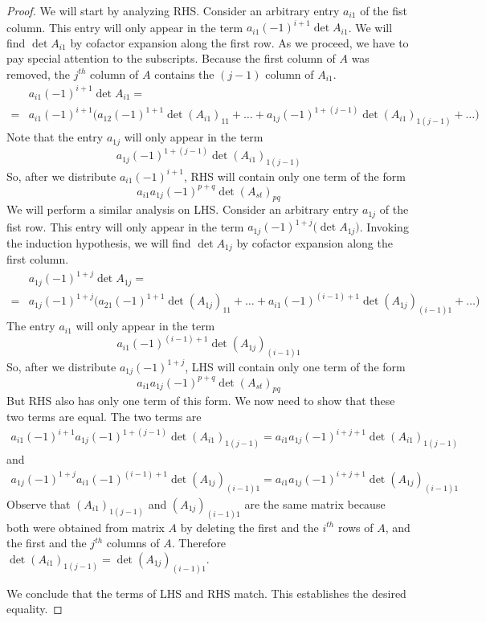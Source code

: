 \documentclass{ximera}
\begin{document}
\begin{proof}
We will start by analyzing RHS.  Consider an arbitrary entry $a_{i1}$ of the fist column.  This entry will only appear in the term $a_{i1}(-1)^{i+1}\det{A_{i1}}$. We will find $\det{A_{i1}}$ by cofactor expansion along the first row.  As we proceed, we have to pay special attention to the subscripts.  Because the first column of $A$ was removed, the $j^{th}$ column of $A$ contains the $(j-1)$ column of $A_{i1}$.  
\begin{align*}
&a_{i1}(-1)^{i+1}\det{A_{i1}}=\\
=&a_{i1}(-1)^{i+1}\Big(a_{12}(-1)^{1+1}\det{(A_{i1})_{11}}+\ldots +a_{1j}(-1)^{1+(j-1)}\det{(A_{i1})_{1(j-1)}}+\ldots \Big)
\end{align*}
Note that the entry $a_{1j}$ will only appear in the term $$a_{1j}(-1)^{1+(j-1)}\det{(A_{i1})_{1(j-1)}}$$
So, after we distribute $a_{i1}(-1)^{i+1}$, RHS will contain only one term of the form
$$a_{i1}a_{1j}(-1)^{p+q}\det{(A_{st})_{pq}}$$
We will perform a similar analysis on LHS.  Consider an arbitrary entry $a_{1j}$ of the fist row.  This entry will only appear in the term $a_{1j}(-1)^{1+j}\big(\det{A_{1j}}\big)$. Invoking the induction hypothesis, we will find $\det{A_{1j}}$ by cofactor expansion along the first column.
\begin{align*}
&a_{1j}(-1)^{1+j}\det{A_{1j}}=\\
=&a_{1j}(-1)^{1+j}\Big(a_{21}(-1)^{1+1}\det{(A_{1j})_{11}}+\ldots +a_{i1}(-1)^{(i-1)+1}\det{(A_{1j})_{(i-1)1}}+\ldots \Big)
\end{align*}
The entry $a_{i1}$ will only appear in the term $$a_{i1}(-1)^{(i-1)+1}\det{(A_{1j})_{(i-1)1}}$$
So, after we distribute $a_{1j}(-1)^{1+j}$, LHS will contain only one term of the form
$$a_{i1}a_{1j}(-1)^{p+q}\det{(A_{st})_{pq}}$$
But RHS also has only one term of this form.  We now need to show that these two terms are equal.  The two terms are
\begin{align*}a_{i1}(-1)^{i+1}a_{1j}(-1)^{1+(j-1)}\det{(A_{i1})_{1(j-1)}}=a_{i1}a_{1j}(-1)^{i+j+1}\det{(A_{i1})_{1(j-1)}}\end{align*}
and 
\begin{align*}a_{1j}(-1)^{1+j}a_{i1}(-1)^{(i-1)+1}\det{(A_{1j})_{(i-1)1}}=a_{i1}a_{1j}(-1)^{i+j+1}\det{(A_{1j})_{(i-1)1}}\end{align*}
Observe that $(A_{i1})_{1(j-1)}$ and $(A_{1j})_{(i-1)1}$ are the same matrix because both were obtained from matrix $A$ by deleting the first and the $i^{th}$ rows of $A$, and the first and the $j^{th}$ columns of $A$.  Therefore $\det{(A_{i1})_{1(j-1)}}=\det{(A_{1j})_{(i-1)1}}$.


We conclude that the terms of LHS and RHS match.  This establishes the desired equality.
\end{proof}
\end{document}
